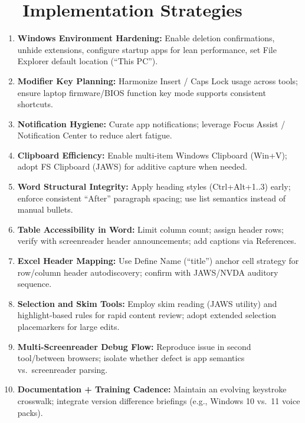 \section{~~Implementation Strategies}
\label{sec:sr25-implementation}
\begin{enumerate}
	\item \textbf{Windows Environment Hardening:} Enable deletion confirmations, unhide extensions, configure startup apps for lean performance, set File Explorer default location (“This PC”).
	\item \textbf{Modifier Key Planning:} Harmonize Insert / Caps Lock usage across tools; ensure laptop firmware/BIOS function key mode supports consistent shortcuts.
	\item \textbf{Notification Hygiene:} Curate app notifications; leverage Focus Assist / Notification Center to reduce alert fatigue.
	\item \textbf{Clipboard Efficiency:} Enable multi-item Windows Clipboard (Win+V); adopt FS Clipboard (JAWS) for additive capture when needed.
	\item \textbf{Word Structural Integrity:} Apply heading styles (Ctrl+Alt+1..3) early; enforce consistent “After” paragraph spacing; use list semantics instead of manual bullets.
	\item \textbf{Table Accessibility in Word:} Limit column count; assign header rows; verify with screenreader header announcements; add captions via References.
	\item \textbf{Excel Header Mapping:} Use Define Name (“title”) anchor cell strategy for row/column header autodiscovery; confirm with JAWS/NVDA auditory sequence.
	\item \textbf{Selection and Skim Tools:} Employ skim reading (JAWS utility) and highlight-based rules for rapid content review; adopt extended selection placemarkers for large edits.
	\item \textbf{Multi-Screenreader Debug Flow:} Reproduce issue in second tool/between browsers; isolate whether defect is app semantics vs.\ screenreader parsing.
	\item \textbf{Documentation + Training Cadence:} Maintain an evolving keystroke crosswalk; integrate version difference briefings (e.g., Windows 10 vs.\ 11 voice packs).
\end{enumerate}

